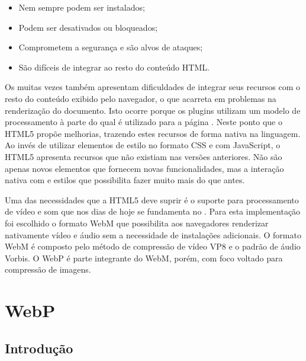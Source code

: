 \documentclass[espaco=simples,appendix=Name]{abnt}
\begin{document}
\begin{itemize}
		\item Nem sempre podem ser instalados;
		\item Podem ser desativados ou bloqueados;
		\item Comprometem a segurança e são alvos de ataques;
		\item São difíceis de integrar ao resto do conteúdo HTML.
\end{itemize}

Os  muitas vezes também apresentam dificuldades de integrar seus recursos com o resto do conteúdo exibido pelo navegador, o que acarreta em problemas na renderização do documento. Isto ocorre porque os plugins utilizam um modelo de processamento à parte do qual é utilizado para a página . Neste ponto que o HTML5 propõe melhorias, trazendo estes recursos de forma nativa na linguagem. Ao invés de utilizar elementos de estilo no formato CSS e  com JavaScript, o HTML5 apresenta recursos que não existiam nas versões anteriores. Não são apenas novos elementos que fornecem novas funcionalidades, mas a interação nativa com  e estilos que possibilita fazer muito mais do que antes\cite{HTML5Intro}.

Uma das necessidades que a HTML5 deve suprir é o suporte para processamento de vídeo e som que nos dias de hoje se fundamenta no . Para esta implementação foi escolhido o formato WebM que possibilita aos navegadores renderizar nativamente vídeo e áudio sem a necessidade de instalações adicionais. O formato WebM é composto pelo método de compressão de vídeo VP8 e o padrão de áudio Vorbis. O WebP é parte integrante do WebM, porém, com foco voltado para compressão de imagens.

\chapter{WebP}

\section{Introdução}
\end{document}
